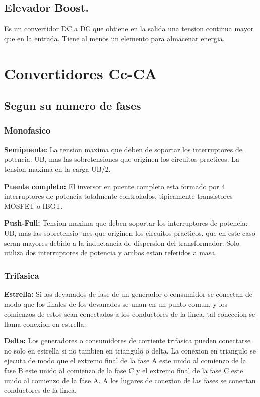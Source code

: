 \documentclass[11pt]{article}
\begin{document}
\subsection{Elevador Boost.}
Es un convertidor DC a DC que obtiene en la salida una tension continua mayor que en la entrada. Tiene al menos un elemento para almacenar energia.
\section{Convertidores Cc-CA}
\subsection{Segun su numero de fases}
\subsubsection{Monofasico}
\textbf{Semipuente:}
La tension maxima que deben de soportar los interruptores de potencia: UB, mas las sobretensiones que originen los circuitos practicos. La tension maxima en la carga UB/2.

\textbf{Puente completo:}
El inversor en puente completo esta formado por 4 interruptores de potencia totalmente
controlados, tipicamente transistores MOSFET o IBGT.

\textbf{Push-Full:}
Tension maxima que deben soportar los interruptores de potencia: UB, mas las sobretensio-
nes que originen los circuitos practicos, que en este caso seran mayores debido a la inductancia
de dispersion del transformador. Solo utiliza dos interruptores de potencia y ambos estan referidos a masa.
\subsubsection{Trifasica}
\textbf{Estrella:}
Si los devanados de fase de un generador o consumidor se conectan de modo que los finales
de los devanados se unan en un punto comun, y los comienzos de estos sean conectados a los
conductores de la linea, tal coneccion se llama conexion en estrella.

\textbf{Delta:}
Los generadores o consumidores de corriente trifasica pueden conectarse no solo en estrella
si no tambien en triangulo o delta. La conexion en triangulo se ejecuta de modo que el extremo
final de la fase A este unido al comienzo de la fase B este unido al comienzo de la fase C y el
extremo final de la fase C este unido al comienzo de la fase A. A los lugares de conexion de las
fases se conectan conductores de la linea.
\end{document}

